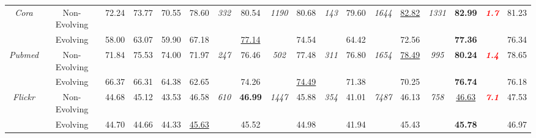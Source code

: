 \begin{table*}[ht!]
{\begin{tabular}{ccccc|cccc|cccc|cc|cc|c}
\multirow{2}{*}{\textit{Cora}}
& Non-Evolving
  & 72.24 & 73.77 & 70.55
  & 78.60 & \multirow{2}{*}{\textit{332}}
  & 80.54 & \multirow{2}{*}{\textit{1190}}
  & 80.68 & \multirow{2}{*}{\textit{143}}
  & 79.60 & \multirow{2}{*}{\textit{1644}}
  & {\underline{82.82}} & \multirow{2}{*}{\textit{1331}}
  & {\textbf{82.99}} & \multirow{2}{*}{\textcolor{red}{\textbf{\textit{1.7}}}}
  & 81.23
\\
& Evolving
  & 58.00 & 63.07 & 59.90
  & 67.18 &
  & {\underline{77.14}} &
  & 74.54 &
  & 64.42 &
  & 72.56 &
  & {\textbf{77.36}} &
  & 76.34
\\ 
\cmidrule{1-18}

\multirow{2}{*}{\textit{Pubmed}}
& Non-Evolving
  & 71.84 & 75.53 & 74.00
  & 71.97 & \multirow{2}{*}{\textit{247}}
  & 76.46 & \multirow{2}{*}{\textit{502}}
  & 77.48 & \multirow{2}{*}{\textit{311}}
  & 76.80 & \multirow{2}{*}{\textit{1654}}
  & {\underline{78.49}} & \multirow{2}{*}{\textit{995}}
  & {\textbf{80.24}} & \multirow{2}{*}{\textcolor{red}{\textbf{\textit{1.4}}}}
  & 78.65
\\
& Evolving
  & 66.37 & 66.31 & 64.38
  & 62.65 &
  & 74.26 &
  & {\underline{74.49}} &
  & 71.38 &
  & 70.25 &
  & {\textbf{76.74}} &
  & 76.18
\\ 
\cmidrule{1-18}

\multirow{2}{*}{\textit{Flickr}}
& Non-Evolving
  & 44.68 & 45.12 & 43.53
  & 46.58 & \multirow{2}{*}{\textit{610}}
  & {\textbf{46.99}} & \multirow{2}{*}{\textit{1447}}
  & 45.88 & \multirow{2}{*}{\textit{354}}
  & 41.01 & \multirow{2}{*}{\textit{7487}}
  & 46.13 & \multirow{2}{*}{\textit{758}}
  & {\underline{46.63}} & \multirow{2}{*}{\textcolor{red}{\textbf{\textit{7.1}}}}
  & 47.53
\\
& Evolving
  & 44.70 & 44.66 & 44.33
  & {\underline{45.63}} &
  & 45.52 &
  & 44.98 &
  & 41.94 &
  & 45.43 &
  & {\textbf{45.78}} &
  & 46.97
\\ 
\cmidrule{1-18}


\end{tabular}}
\end{table*}
